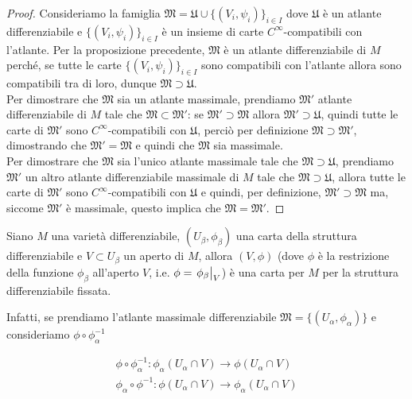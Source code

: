 \begin{proof}
	Consideriamo la famiglia $ \mathfrak{M} = \mathfrak{U} \cup \{(V_{i},\psi_{i})\}_{i \in I} $ dove $ \mathfrak{U} $ è un atlante differenziabile e $ \{(V_{i},\psi_{i})\}_{i \in I} $ è un insieme di carte $ C^{\infty} $-compatibili con l'atlante. Per la proposizione precedente, $ \mathfrak{M} $ è un atlante differenziabile di $ M $ perché, se tutte le carte $ \{(V_{i},\psi_{i})\}_{i \in I} $ sono compatibili con l'atlante allora sono compatibili tra di loro, dunque $ \mathfrak{M} \supset \mathfrak{U} $.\\
	Per dimostrare che $ \mathfrak{M} $ sia un atlante massimale, prendiamo $ \mathfrak{M}' $ atlante differenziabile di $ M $ tale che $ \mathfrak{M} \subset \mathfrak{M}' $: se $ \mathfrak{M}' \supset \mathfrak{M} $ allora $ \mathfrak{M}' \supset \mathfrak{U} $, quindi tutte le carte di $ \mathfrak{M}' $ sono $ C^{\infty} $-compatibili con $ \mathfrak{U} $, perciò per definizione $ \mathfrak{M} \supset \mathfrak{M}' $, dimostrando che $ \mathfrak{M}' = \mathfrak{M} $ e quindi che $ \mathfrak{M} $ sia massimale.\\
	Per dimostrare che $ \mathfrak{M} $ sia l'unico atlante massimale tale che $ \mathfrak{M} \supset \mathfrak{U} $, prendiamo $ \mathfrak{M}' $ un altro atlante differenziabile massimale di $ M $ tale che $ \mathfrak{M} \supset \mathfrak{U} $, allora tutte le carte di $ \mathfrak{M}' $ sono $ C^{\infty} $-compatibili con $ \mathfrak{U} $ e quindi, per definizione, $ \mathfrak{M}' \supset \mathfrak{M} $ ma, siccome $ \mathfrak{M}' $ è massimale, questo implica che $ \mathfrak{M} = \mathfrak{M}' $.
\end{proof}

\begin{remark}
	Siano $ M $ una varietà differenziabile, $ (U_{\beta},\phi_{\beta}) $ una carta della struttura differenziabile e $ V \subset U_{\beta} $ un aperto di $ M $, allora $ (V,\phi) $ (dove $ \phi $ è la restrizione della funzione $ \phi_{\beta} $ all'aperto $ V $, i.e. $ \phi = \eval{\phi_{\beta}}_{V} $) è una carta per $ M $ per la struttura differenziabile fissata.
\end{remark}

Infatti, se prendiamo l'atlante massimale differenziabile $ \mathfrak{M} = \{(U_{\alpha},\phi_{\alpha})\} $ e consideriamo $ \phi \circ \phi_{\alpha}^{-1} $

\begin{gather}
	\phi \circ \phi_{\alpha}^{-1} : \phi_{\alpha}(U_{\alpha} \cap V) \to \phi(U_{\alpha} \cap V)\\
	\phi_{\alpha} \circ \phi^{-1} : \phi(U_{\alpha} \cap V) \to \phi_{\alpha}(U_{\alpha} \cap V)
\end{gather}

